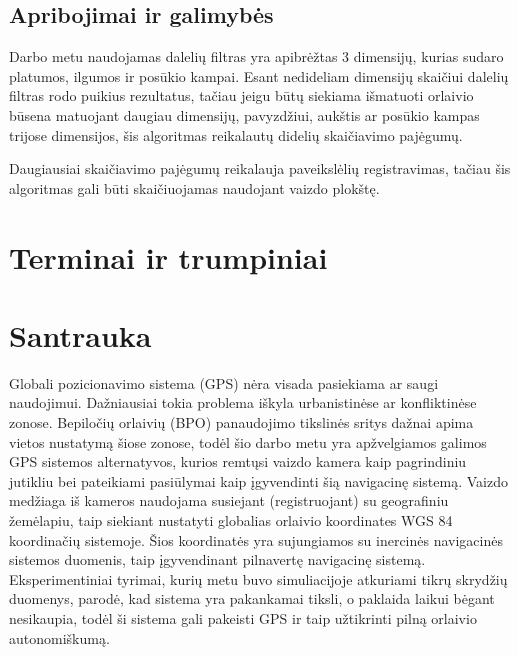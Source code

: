 \documentclass[a4paper,12pt]{article}
\begin{document}
	\subsection{Apribojimai ir galimybės}
	
			Darbo metu naudojamas dalelių filtras yra apibrėžtas 3 dimensijų, kurias sudaro platumos, ilgumos ir posūkio kampai. Esant nedideliam dimensijų skaičiui dalelių filtras rodo puikius rezultatus, tačiau jeigu būtų siekiama išmatuoti orlaivio būsena matuojant daugiau dimensijų, pavyzdžiui, aukštis ar posūkio kampas trijose dimensijos, šis algoritmas reikalautų didelių skaičiavimo pajėgumų.
					
			Daugiausiai skaičiavimo pajėgumų reikalauja paveikslėlių registravimas, tačiau šis algoritmas gali būti skaičiuojamas naudojant vaizdo plokštę.
	\pagebreak
	\section*{Terminai ir trumpiniai}
		\printglossary[title=,toctitle=Terminai ir trumpiniai]
		
		\pagebreak
		
		


	\clearpage	  
	\section*{Santrauka}
		\thispagestyle{empty}
		
		Globali pozicionavimo sistema (GPS) nėra visada pasiekiama ar saugi naudojimui. Dažniausiai tokia problema iškyla urbanistinėse ar konfliktinėse zonose. 
		Bepiločių orlaivių (BPO) panaudojimo tikslinės sritys dažnai apima vietos nustatymą šiose zonose, todėl šio darbo metu yra apžvelgiamos galimos GPS sistemos alternatyvos, kurios remtųsi vaizdo kamera kaip pagrindiniu jutikliu bei pateikiami pasiūlymai kaip įgyvendinti šią navigacinę sistemą.
		Vaizdo medžiaga iš kameros naudojama susiejant (registruojant) su geografiniu žemėlapiu, taip siekiant nustatyti globalias orlaivio koordinates WGS 84 koordinačių sistemoje. Šios koordinatės yra sujungiamos su inercinės navigacinės sistemos duomenis, taip įgyvendinant pilnavertę navigacinę sistemą.
		Eksperimentiniai  tyrimai, kurių metu buvo simuliacijoje atkuriami tikrų skrydžių duomenys, parodė, kad sistema yra pakankamai tiksli, o paklaida laikui bėgant nesikaupia, todėl ši sistema gali pakeisti GPS ir taip užtikrinti pilną orlaivio autonomiškumą. 
		
\end{document}
